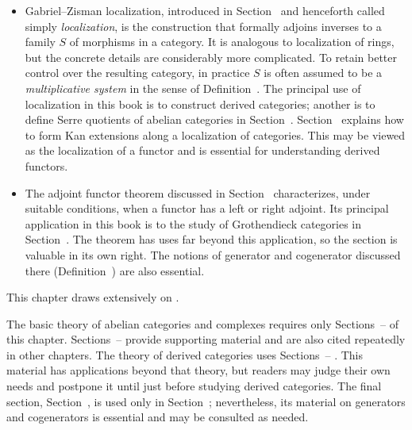 \begin{itemize}
	\item Gabriel--Zisman localization, introduced in
	Section~ and henceforth called
	simply \emph{localization}, is the construction that formally adjoins
	inverses to a family $S$ of morphisms in a category. It is analogous to
	localization of rings, but the concrete details are considerably more
	complicated. To retain better control over the resulting category, in
	practice $S$ is often assumed to be a \emph{multiplicative system} in the
	sense of Definition~.
	The principal use of localization in this book is to construct derived
	categories; another is to define Serre quotients of abelian categories in
	Section~.
	Section~ explains how to
	form Kan extensions along a localization of categories. This may be viewed
	as the localization of a functor and is essential for understanding derived
	functors.

	\item The adjoint functor theorem discussed in
	Section~ characterizes, under suitable
	conditions, when a functor has a left or right adjoint. Its principal
	application in this book is to the study of Grothendieck categories in
	Section~. The theorem has uses
	far beyond this application, so the section is valuable in its own right.
	The notions of generator and cogenerator discussed there
	(Definition~) are also essential.
\end{itemize}

This chapter draws extensively on \cite{KS06, Rie16}.

\begin{petunjukbacaan}
The basic theory of abelian categories and complexes requires only
Sections~--%
 of this chapter.
Sections~--%
 provide supporting material and are
also cited repeatedly in other chapters. The theory of derived categories uses
Sections~--%
. This material has applications
beyond that theory, but readers may judge their own needs and postpone it until
just before studying derived categories. The final section,
Section~, is used only in
Section~; nevertheless, its material
on generators and cogenerators is essential and may be consulted as needed.
\end{petunjukbacaan}
